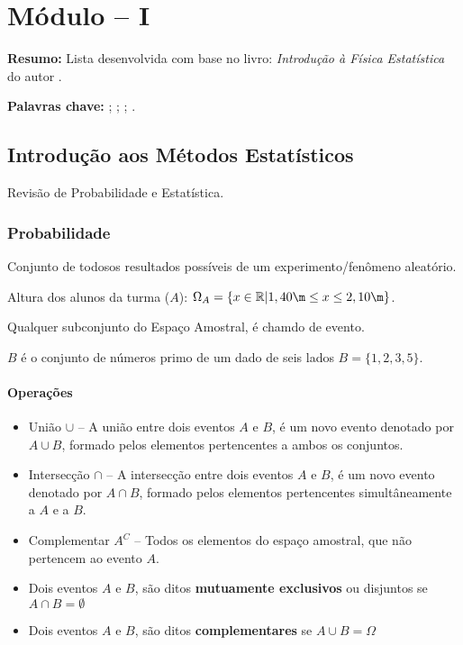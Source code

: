 \chapter{Módulo -- I}
\noindent \textbf{Resumo:} Lista desenvolvida com base no livro: \emph{Introdução à Física Estatística} do autor \citeauthor{SALINAS:2001}.

\par\noindent \textbf{Palavras chave:} \firstkey ; \secondkey ; \thirdkey ; \fourthkey.

\section{Introdução aos Métodos Estatísticos}
Revisão de Probabilidade e Estatística.
\subsection{Probabilidade}
\begin{definition}
	Conjunto de todosos resultados possíveis de um experimento/fenômeno aleatório.
\end{definition}
\begin{exmp}
	Altura dos alunos da turma ($A$): $\Omega_A=\{ x\in \mathbb{R} \vert 1,40\m\leq x\leq 2,10\m\}$.	
\end{exmp}
\begin{definition}[Evento]
	Qualquer subconjunto do Espaço Amostral, é chamdo de evento.
\end{definition}
\begin{exmp}
	$B$ é o conjunto de números primo de um dado de seis lados $B=\{1,2,3,5\}$.
\end{exmp}
\subsubsection{Operações}
\begin{itemize}
	\item União $\cup$ -- A união entre dois eventos $A$ e $B$, é um novo evento denotado por $A\cup B$, formado pelos elementos pertencentes a ambos os conjuntos.
	\item Intersecção $\cap$ -- A intersecção entre dois eventos $A$ e $B$, é um novo evento denotado por $A\cap B$, formado pelos elementos pertencentes simultâneamente a $A$ e a $B$.
	\item Complementar $A^C$ -- Todos os elementos do espaço amostral, que não pertencem ao evento $A$.
	\item Dois eventos $A$ e $B$, são ditos \textbf{mutuamente exclusivos} ou disjuntos se $A\cap B=\emptyset$
	\item Dois eventos $A$ e $B$, são ditos \textbf{complementares} se $A\cup B=\Omega$
\end{itemize}

